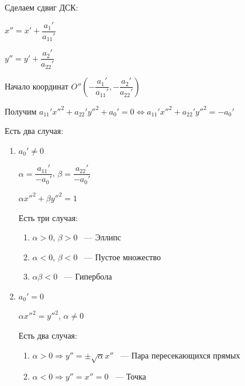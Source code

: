 \documentclass[twoside]{book}
\begin{document}
\begin{enumerate}
\begin{enumerate}
                    Сделаем сдвиг ДСК:

                    \(x'' = x' + \dfrac{a_1'}{a_{11}'}\)

                    \(y'' = y' + \dfrac{a_2'}{a_{22}'}\)

                    Начало координат \(O''\left(-\dfrac{a_1'}{a_{11}'}, -\dfrac{a_2'}{a_{22}'}\right)\)

                    Получим \(a_{11}' x''^2 + a_{22}' y''^2 + a_0' = 0 \Leftrightarrow a_{11}' x''^2 + a_{22}' y''^2 = -a_0'\)

                    Есть два случая:
                    \begin{enumerate}
                        \item \(a_0' \neq 0\)

                              \(\alpha = \dfrac{a_{11}'}{-a_0'}\), \(\beta = \dfrac{a_{22}'}{-a_0'}\)

                              \(\alpha x''^2 + \beta y''^2 = 1\)

                              Есть три случая:
                              \begin{enumerate}
                                  \item \(\alpha > 0\), \(\beta > 0\) ~--- Эллипс

                                  \item \(\alpha < 0\), \(\beta < 0\) ~--- Пустое множество

                                  \item \(\alpha \beta < 0\) ~---  Гипербола
                              \end{enumerate}
                        \item \(a_0' = 0\)

                              \(\alpha x''^2 = y''^2\), \(\alpha \neq 0\)

                              Есть два случая:
                              \begin{enumerate}
                                  \item \(\alpha > 0 \Rightarrow y'' = \pm \sqrt \alpha x''\) ~--- Пара пересекающихся прямых

                                  \item \(\alpha < 0 \Rightarrow y'' = x'' = 0\) ~--- Точка
                              \end{enumerate}
                    \end{enumerate}


\end{enumerate}
\end{enumerate}
\end{document}
